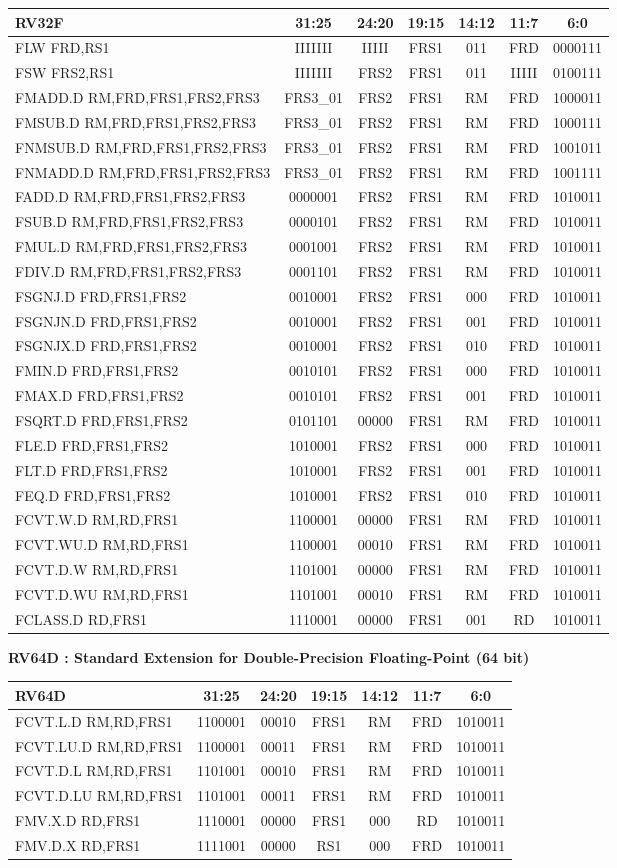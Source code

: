 \documentclass[
]{article}
\begin{document}
\begin{longtable}[]{@{}lcccccc@{}}
\toprule
RV32F & 31:25 & 24:20 & 19:15 & 14:12 & 11:7 & 6:0\tabularnewline
\midrule
\endhead
FLW FRD,RS1 & IIIIIII & IIIII & FRS1 & 011 & FRD &
0000111\tabularnewline
FSW FRS2,RS1 & IIIIIII & FRS2 & FRS1 & 011 & IIIII &
0100111\tabularnewline
FMADD.D RM,FRD,FRS1,FRS2,FRS3 & FRS3\_01 & FRS2 & FRS1 & RM & FRD &
1000011\tabularnewline
FMSUB.D RM,FRD,FRS1,FRS2,FRS3 & FRS3\_01 & FRS2 & FRS1 & RM & FRD &
1000111\tabularnewline
FNMSUB.D RM,FRD,FRS1,FRS2,FRS3 & FRS3\_01 & FRS2 & FRS1 & RM & FRD &
1001011\tabularnewline
FNMADD.D RM,FRD,FRS1,FRS2,FRS3 & FRS3\_01 & FRS2 & FRS1 & RM & FRD &
1001111\tabularnewline
FADD.D RM,FRD,FRS1,FRS2,FRS3 & 0000001 & FRS2 & FRS1 & RM & FRD &
1010011\tabularnewline
FSUB.D RM,FRD,FRS1,FRS2,FRS3 & 0000101 & FRS2 & FRS1 & RM & FRD &
1010011\tabularnewline
FMUL.D RM,FRD,FRS1,FRS2,FRS3 & 0001001 & FRS2 & FRS1 & RM & FRD &
1010011\tabularnewline
FDIV.D RM,FRD,FRS1,FRS2,FRS3 & 0001101 & FRS2 & FRS1 & RM & FRD &
1010011\tabularnewline
FSGNJ.D FRD,FRS1,FRS2 & 0010001 & FRS2 & FRS1 & 000 & FRD &
1010011\tabularnewline
FSGNJN.D FRD,FRS1,FRS2 & 0010001 & FRS2 & FRS1 & 001 & FRD &
1010011\tabularnewline
FSGNJX.D FRD,FRS1,FRS2 & 0010001 & FRS2 & FRS1 & 010 & FRD &
1010011\tabularnewline
FMIN.D FRD,FRS1,FRS2 & 0010101 & FRS2 & FRS1 & 000 & FRD &
1010011\tabularnewline
FMAX.D FRD,FRS1,FRS2 & 0010101 & FRS2 & FRS1 & 001 & FRD &
1010011\tabularnewline
FSQRT.D FRD,FRS1,FRS2 & 0101101 & 00000 & FRS1 & RM & FRD &
1010011\tabularnewline
FLE.D FRD,FRS1,FRS2 & 1010001 & FRS2 & FRS1 & 000 & FRD &
1010011\tabularnewline
FLT.D FRD,FRS1,FRS2 & 1010001 & FRS2 & FRS1 & 001 & FRD &
1010011\tabularnewline
FEQ.D FRD,FRS1,FRS2 & 1010001 & FRS2 & FRS1 & 010 & FRD &
1010011\tabularnewline
FCVT.W.D RM,RD,FRS1 & 1100001 & 00000 & FRS1 & RM & FRD &
1010011\tabularnewline
FCVT.WU.D RM,RD,FRS1 & 1100001 & 00010 & FRS1 & RM & FRD &
1010011\tabularnewline
FCVT.D.W RM,RD,FRS1 & 1101001 & 00000 & FRS1 & RM & FRD &
1010011\tabularnewline
FCVT.D.WU RM,RD,FRS1 & 1101001 & 00010 & FRS1 & RM & FRD &
1010011\tabularnewline
FCLASS.D RD,FRS1 & 1110001 & 00000 & FRS1 & 001 & RD &
1010011\tabularnewline
\bottomrule
\end{longtable}

\textbf{RV64D : Standard Extension for Double-Precision Floating-Point
(64 bit)}

\begin{longtable}[]{@{}lcccccc@{}}
\toprule
RV64D & 31:25 & 24:20 & 19:15 & 14:12 & 11:7 & 6:0\tabularnewline
\midrule
\endhead
FCVT.L.D RM,RD,FRS1 & 1100001 & 00010 & FRS1 & RM & FRD &
1010011\tabularnewline
FCVT.LU.D RM,RD,FRS1 & 1100001 & 00011 & FRS1 & RM & FRD &
1010011\tabularnewline
FCVT.D.L RM,RD,FRS1 & 1101001 & 00010 & FRS1 & RM & FRD &
1010011\tabularnewline
FCVT.D.LU RM,RD,FRS1 & 1101001 & 00011 & FRS1 & RM & FRD &
1010011\tabularnewline
FMV.X.D RD,FRS1 & 1110001 & 00000 & FRS1 & 000 & RD &
1010011\tabularnewline
FMV.D.X RD,FRS1 & 1111001 & 00000 & RS1 & 000 & FRD &
1010011\tabularnewline
\bottomrule
\end{longtable}
\end{document}
